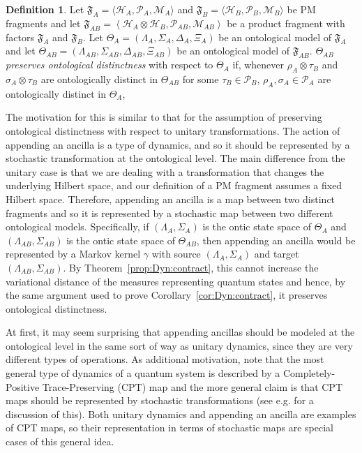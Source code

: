 \documentclass[DIV=calc,fontsize=12pt]{scrartcl} %
\theoremstyle{definition}
\newtheorem{definition}{Definition}[section]
\theoremstyle{plain}
\newcommand{\Hilb}[1][]{\ensuremath{\mathcal{H}_{#1}}}
\begin{document}
\begin{definition}
\label{def:Dyn:aind}
Let $\mathfrak{F}_A = \langle \Hilb[A], \mathcal{P}_A, \mathcal{M}_A
\rangle$ and $\mathfrak{F}_B = \langle \Hilb[B], \mathcal{P}_B,
\mathcal{M}_B \rangle$ be PM fragments and let $\mathfrak{F}_{AB} =
\left \langle \Hilb[A] \otimes \Hilb[B], \mathcal{P}_{AB} ,
\mathcal{M}_{AB} \right \rangle$ be a product fragment with
factors $\mathfrak{F}_A$ and $\mathfrak{F}_B$.  Let $\Theta_A =
(\Lambda_A, \Sigma_A, \Delta_A,\Xi_A)$ be an ontological model of
$\mathfrak{F}_A$ and let $\Theta_{AB} = (\Lambda_{AB}, \Sigma_{AB},
\Delta_{AB}, \Xi_{AB})$ be an ontological model of
$\mathfrak{F}_{AB}$.  $\Theta_{AB}$ \emph{preserves ontological
distinctness} with respect to $\Theta_A$ if, whenever $\rho_A
\otimes \tau_B$ and $\sigma_A \otimes \tau_B$ are ontologically
distinct in $\Theta_{AB}$ for some $\tau_B \in \mathcal{P}_B$,
$\rho_A, \sigma_A \in \mathcal{P}_A$ are ontologically distinct in
$\Theta_A$,
\end{definition}

The motivation for this is similar to that for the assumption of
preserving ontological distinctness with respect to unitary
transformations.  The action of appending an ancilla is a type of
dynamics, and so it should be represented by a stochastic
transformation at the ontological level.  The main difference from the
unitary case is that we are dealing with a transformation that changes
the underlying Hilbert space, and our definition of a PM fragment
assumes a fixed Hilbert space.  Therefore, appending an ancilla is a
map between two distinct fragments and so it is represented by a
stochastic map between two different ontological models.
Specifically, if $(\Lambda_A, \Sigma_A)$ is the ontic state space of
$\Theta_A$ and $(\Lambda_{AB},\Sigma_{AB})$ is the ontic state space
of $\Theta_{AB}$, then appending an ancilla would be represented by a
Markov kernel $\gamma$ with source $(\Lambda_A, \Sigma_A)$ and target
$(\Lambda_{AB},\Sigma_{AB})$.  By Theorem~\ref{prop:Dyn:contract},
this cannot increase the variational distance of the measures
representing quantum states and hence, by the same argument used to
prove Corollary~\ref{cor:Dyn:contract}, it preserves ontological
distinctness.

At first, it may seem surprising that appending ancillas should be
modeled at the ontological level in the same sort of way as unitary
dynamics, since they are very different types of operations.  As
additional motivation, note that the most general type of dynamics of
a quantum system is described by a Completely-Positive
Trace-Preserving (CPT) map and the more general claim is that CPT maps
should be represented by stochastic transformations (see
e.g. \cite{Spekkens2005} for a discussion of this).  Both unitary
dynamics and appending an ancilla are examples of CPT maps, so their
representation in terms of stochastic maps are special cases of this
general idea.
\end{document}
